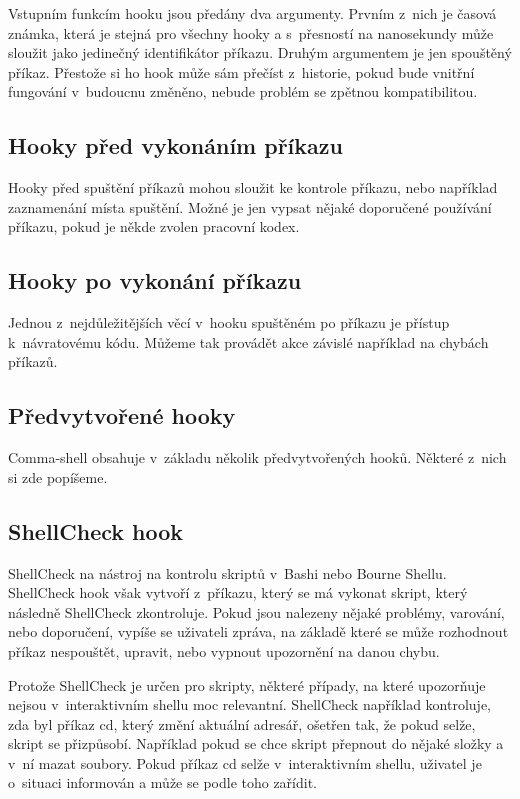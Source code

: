\documentclass[thesis=M,czech]{FITthesis}[2012/06/26]
\begin{document}
Vstupním funkcím hooku jsou předány dva argumenty. Prvním z~nich je časová známka, která je stejná pro všechny hooky a s~přesností na nanosekundy může sloužit jako jedinečný identifikátor příkazu. Druhým argumentem je jen spouštěný příkaz. Přestože si ho hook může sám přečíst z~historie, pokud bude vnitřní fungování v~budoucnu změněno, nebude problém se zpětnou kompatibilitou.

\subsection{Hooky před vykonáním příkazu}

Hooky před spuštění příkazů mohou sloužit ke kontrole příkazu, nebo například zaznamenání místa spuštění. Možné je jen vypsat nějaké doporučené používání příkazu, pokud je někde zvolen pracovní kodex.

\subsection{Hooky po vykonání příkazu}

Jednou z~nejdůležitějších věcí v~hooku spuštěném po příkazu je přístup k~návratovému kódu. Můžeme tak provádět akce závislé například na chybách příkazů.

\subsection{Předvytvořené hooky}

Comma-shell obsahuje v~základu několik předvytvořených hooků. Některé z~nich si zde popíšeme.


%
\subsection{ShellCheck hook}

ShellCheck na nástroj na kontrolu skriptů v~Bashi nebo Bourne Shellu. ShellCheck hook však vytvoří z~příkazu, který se má vykonat skript, který následně ShellCheck zkontroluje. Pokud jsou nalezeny nějaké problémy, varování, nebo doporučení, vypíše se uživateli zpráva, na základě které se může rozhodnout příkaz nespouštět, upravit, nebo vypnout upozornění na danou chybu.

Protože ShellCheck je určen pro skripty, některé případy, na které upozorňuje nejsou v~interaktivním shellu moc relevantní. ShellCheck například kontroluje, zda byl příkaz cd, který změní aktuální adresář, ošetřen tak, že pokud selže, skript se přizpůsobí. Například pokud se chce skript přepnout do nějaké složky a v~ní mazat soubory. Pokud příkaz cd selže v~interaktivním shellu, uživatel je o~situaci informován a může se podle toho zařídit.
\end{document}
